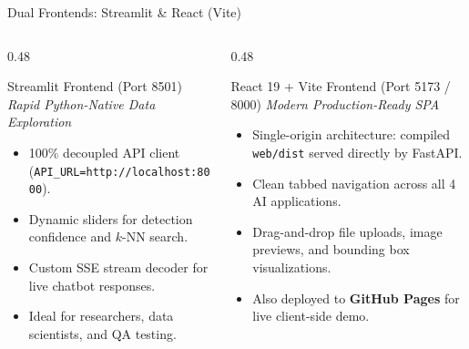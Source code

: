 \documentclass[aspectratio=169, 10pt]{beamer}
\begin{document}
\begin{frame}{Dual Frontends: Streamlit \& React (Vite)}
  \begin{columns}[T]
    \begin{column}{0.48\textwidth}
      \begin{block}{Streamlit Frontend (Port 8501)}
        \textit{Rapid Python-Native Data Exploration}
        \begin{itemize}
          \item 100\% decoupled API client (\texttt{API\_URL=http://localhost:8000}).
          \item Dynamic sliders for detection confidence and $k$-NN search.
          \item Custom SSE stream decoder for live chatbot responses.
          \item Ideal for researchers, data scientists, and QA testing.
        \end{itemize}
      \end{block}
    \end{column}

    \begin{column}{0.48\textwidth}
      \begin{block}{React 19 + Vite Frontend (Port 5173 / 8000)}
        \textit{Modern Production-Ready SPA}
        \begin{itemize}
          \item Single-origin architecture: compiled \texttt{web/dist} served directly by FastAPI.
          \item Clean tabbed navigation across all 4 AI applications.
          \item Drag-and-drop file uploads, image previews, and bounding box visualizations.
          \item Also deployed to \textbf{GitHub Pages} for live client-side demo.
        \end{itemize}
      \end{block}
    \end{column}
  \end{columns}
\end{frame}
\end{document}

